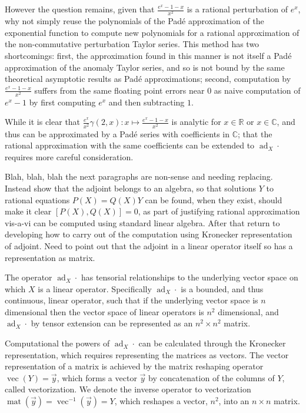 However the question remains, given that $\frac{e^{x} -1 - x}{x^2}$ is a 
rational perturbation of $e^x$, why not simply reuse the polynomials of the 
Pad\'{e} approximation of the exponential function to compute new polynomials 
for a rational approximation of the non-commutative perturbation Taylor series. 
This method has two shortcomings: first, the approximation found in this manner 
is not itself a Pad\'{e} approximation of the anomaly Taylor series, and so is 
not bound by the same theoretical asymptotic results as Pad\'{e} approximations;
second, computation by $\frac{e^{x} -1 - x}{x^2}$ suffers from the same floating 
point errors near $0$ as naive computation of $e^x - 1$ by first computing $e^x$ 
and then subtracting $1$.

While it is clear that $\frac{e^x}{x^2}\gamma\left(2,x\right) : x \mapsto \frac{e^{x} -1 - x}{x^2}$ 
is analytic for $x \in \mathbb{R}$ or $x \in \mathbb{C}$, and thus can be 
approximated by a Pad\'{e} series with coefficients in $\mathbb{C}$; that the
rational approximation with the same coefficients can be extended to $\operatorname{ad}_X \cdotp$ 
requires more careful consideration.

Blah, blah, blah the next paragraphs are non-sense and needing replacing. Instead 
show that the adjoint belongs to an algebra, so that solutions $Y$ to rational 
equations $P(X)=Q(X)Y$ can be found, when they exist, should make it clear $[P(X),Q(X)]=0$,
as part of justifying rational approximation vis-a-vi can be computed using 
standard linear algebra. After that return to developing how to carry out of the 
computation using Kronecker representation of adjoint. Need to point out that
the adjoint in a linear operator itself so has a representation as matrix.

The operator $\operatorname{ad}_X \cdotp$ has tensorial relationships to the 
underlying vector space on which $X$ is a linear operator. Specifically $\operatorname{ad}_X \cdotp$
is a bounded, and thus continuous, linear operator, such that if the underlying 
vector space is $n$ dimensional then the vector space of linear operators is 
$n^2$ dimensional, and $\operatorname{ad}_X \cdotp$ by tensor extension can be 
represented as an $n^2 \times n^2$ matrix. 

Computational the powers of $\operatorname{ad}_X \cdotp$ can be calculated 
through the Kronecker representation, which requires representing the matrices 
as vectors. The vector representation of a matrix is achieved by the matrix 
reshaping  operator $\operatorname{vec}\left(Y\right) = \vec{y}$, which forms a 
vector $\vec{y}$ by concatenation of the columns of $Y$, called vectorization. 
We denote the inverse operator to vectorization $\operatorname{mat}\left(\vec{y}\right) = \operatorname{vec}^{-1}\left(\vec{y}\right) = Y$,
which reshapes a vector, $n^2$, into an $n \times n$ matrix.

